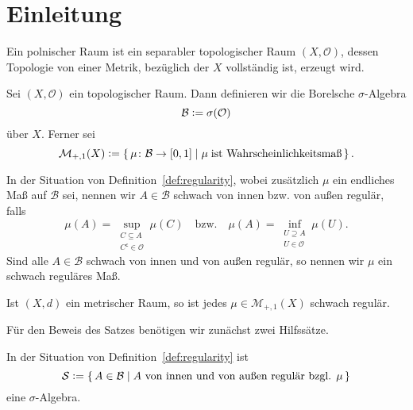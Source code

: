 \documentclass[../main/main.tex]{subfiles}
\begin{document}
	
	\section{Einleitung}
	
	
	\begin{Definition}
		Ein polnischer Raum ist ein separabler topologischer Raum $(X, \mathcal{O})$, dessen Topologie von einer Metrik, bezüglich der $X$ vollständig ist, erzeugt wird.
	\end{Definition}

	\begin{Definition}
		\label{def:borel}
		Sei $(X, \mathcal{O})$ ein topologischer Raum. Dann definieren wir die Borelsche $\sigma$-Algebra
		$$\mathcal{B} \vcentcolon = \sigma(\mathcal{O})$$
		über $X$. Ferner sei
		$$\mathcal{M}_{+,1}(X) \vcentcolon = \left\{\, \mu \colon \mathcal{B} \to [0,1] \; | \; \mu \; \text{ist Wahrscheinlichkeitsmaß} \,\right\}\text{.}$$
	\end{Definition}

	\begin{Definition}
		\label{def:regularity}
		In der Situation von Definition~\ref{def:regularity}, wobei zusätzlich $\mu$ ein endliches Maß auf $\mathcal{B}$ sei, nennen wir $A \in \mathcal{B}$ schwach von innen bzw. von außen regulär, falls
		$$\mu(A) = \sup_{\substack{C \subseteq A \\ C^\mathsf{c} \in \mathcal{O}}} \mu(C) \quad \text{bzw.} \quad \mu(A) = \inf_{\substack{U \supseteq A \\ U \in \mathcal{O}}} \mu(U)\text{.}$$
		Sind alle $A \in \mathcal{B}$ schwach von innen und von außen regulär, so nennen wir $\mu$ ein schwach reguläres Maß.
	\end{Definition}

	\begin{Satz}
		Ist $(X, d)$ ein metrischer Raum, so ist jedes $\mu \in \mathcal{M}_{+, 1}(X)$ schwach regulär.
	\end{Satz}

	Für den Beweis des Satzes benötigen wir zunächst zwei Hilfssätze.
	
	\begin{Hilfssatz}
		In der Situation von Definition~\ref{def:regularity} ist
		$$\mathcal{S} \vcentcolon = \left\{\, A \in \mathcal{B} \; | \; A \text{ von innen und von außen regulär bzgl. } \mu \,\right\}$$
		eine $\sigma$-Algebra.
	\end{Hilfssatz}
\end{document}
